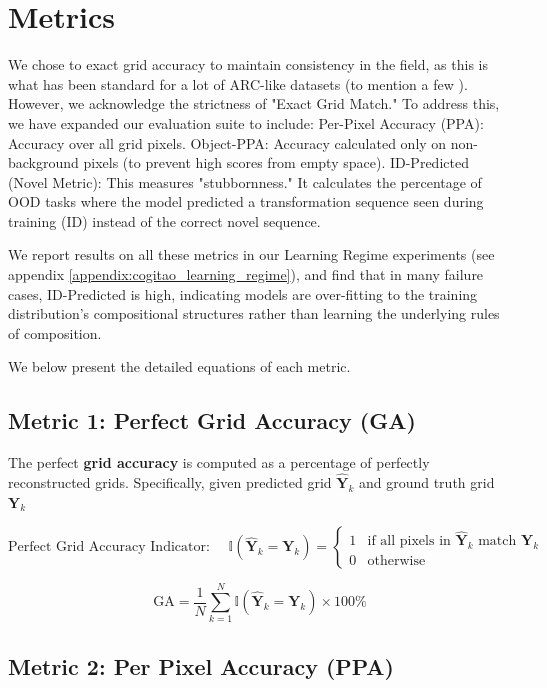 \section{Metrics}\label{appendix:metrics}

We chose to exact grid accuracy to maintain consistency in the field, as this is what has been standard for a lot of ARC-like datasets (to mention a few \cite{arc_vit, cholletARC}). However, we acknowledge the strictness of "Exact Grid Match." To address this, we have expanded our evaluation suite to include:
Per-Pixel Accuracy (PPA): Accuracy over all grid pixels.
Object-PPA: Accuracy calculated only on non-background pixels (to prevent high scores from empty space).
ID-Predicted (Novel Metric): This measures "stubbornness." It calculates the percentage of OOD tasks where the model predicted a transformation sequence seen during training (ID) instead of the correct novel sequence.

We report results on all these metrics in our Learning Regime experiments (see appendix \ref{appendix:cogitao_learning_regime}), and find that in many failure cases, ID-Predicted is high, indicating models are over-fitting to the training distribution's compositional structures rather than learning the underlying rules of composition.

We below present the detailed equations of each metric.

\subsection{Metric 1: Perfect Grid Accuracy (GA)}

The perfect \textbf{grid accuracy} is computed as a percentage of perfectly reconstructed grids. Specifically, given predicted grid $\hat{\mathbf{Y}}_k$ and ground truth grid $\mathbf{Y}_k$ 

$$\text{Perfect Grid Accuracy Indicator: } \quad \mathbb{I}(\hat{\mathbf{Y}}_k = \mathbf{Y}_k) = 
\begin{cases} 
1 & \text{if all pixels in } \hat{\mathbf{Y}}_k \text{ match } \mathbf{Y}_k \\
0 & \text{otherwise}
\end{cases}
$$

$$\text{GA} = \frac{1}{N} \sum_{k=1}^{N} \mathbb{I}(\hat{\mathbf{Y}}_k = \mathbf{Y}_k) \times 100\%$$

\subsection{Metric 2: Per Pixel Accuracy (PPA)}

